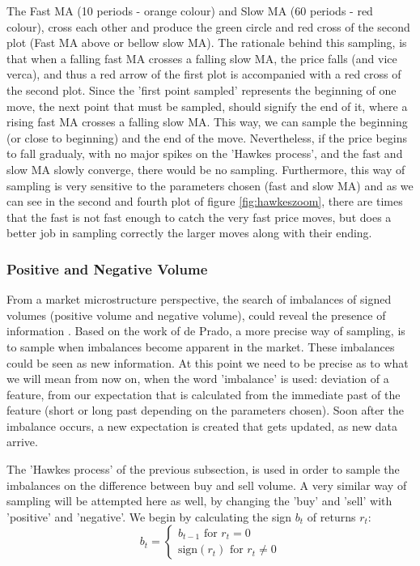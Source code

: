 The Fast MA (10 periods - orange colour) and Slow MA (60 periods - red colour), cross each other and produce the green circle and red cross of the second plot (Fast MA above or bellow slow MA). The rationale behind this sampling, is that when a falling fast MA crosses a falling slow MA, the price falls (and vice verca), and thus a red arrow of the first plot is accompanied with a red cross of the second plot. Since the 'first point sampled' represents the beginning of one move, the next point that must be sampled, should signify the end of it, where a rising fast MA crosses a falling slow MA. This way, we can sample the beginning (or close to beginning) and the end of the move. Nevertheless, if the price begins to fall gradualy, with no major spikes on the 'Hawkes process', and the fast and slow MA slowly converge, there would be no sampling. Furthermore, this way of sampling is very sensitive to the parameters chosen (fast and slow MA) and as we can see in the second and fourth plot of figure \ref{fig:hawkeszoom}, there are times that the fast is not fast enough to catch the very fast price moves, but does a better job in sampling correctly the larger moves along with their ending.

\subsubsection{Positive and Negative Volume}


From a market microstructure perspective, the search of imbalances of signed volumes (positive volume and negative volume), could reveal the presence of information \cite{marcos}. Based on the work of de Prado, a more precise way of sampling, is to sample when imbalances become apparent in the market. These imbalances could be seen as new information. At this point we need to be precise as to what we will mean from now on, when the word 'imbalance' is used: deviation of a feature, from our expectation that is calculated from the immediate past of the feature (short or long past depending on the parameters chosen). Soon after the imbalance occurs, a new expectation is created that gets updated, as new data arrive.

The 'Hawkes process' of the previous subsection, is used in order to sample the imbalances on the difference between buy and sell volume. A very similar way of sampling will be attempted here as well, by changing the 'buy' and 'sell' with 'positive' and 'negative'. We begin by calculating the sign \(b_t\) of returns \(r_t\):
\[ 
b_t =
\begin{cases}
b_{t-1} \text{ for } r_t = 0 \\
\text{sign}(r_t) \text{ for } r_t \neq 0
\end{cases}
\]

